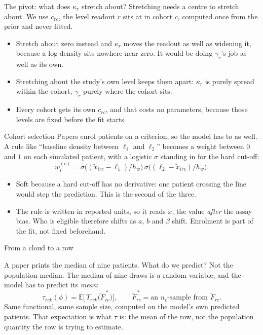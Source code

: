 \documentclass[10pt,aspectratio=169]{beamer}
\begin{document}
\begin{frame}[t]{The pivot: what does $\kappa_r$ stretch about?}
  Stretching needs a centre to stretch about. We use $c_{rc}$, the level readout
  $r$ sits at in cohort $c$, computed once from the prior and never fitted.
  \begin{itemize}\setlength\itemsep{8pt}
    \item Stretch about zero instead and $\kappa_r$ moves the readout as well as
      widening it, because a log density sits nowhere near zero. It would be
      doing $\gamma_r$'s job as well as its own.
    \item Stretching about the study's own level keeps them apart: $\kappa_r$ is
      purely spread within the cohort, $\gamma_r$ purely where the cohort sits.
    \item Every cohort gets its own $c_{rc}$, and that costs no parameters,
      because those levels are fixed before the fit starts.
  \end{itemize}
\end{frame}

\begin{frame}[t]{Cohort selection}
  Papers enrol patients on a criterion, so the model has to as well. A rule like
  ``baseline density between $\ell_1$ and $\ell_2$'' becomes a weight between $0$
  and $1$ on each simulated patient, with a logistic $\sigma$ standing in for the
  hard cut-off:
  \[
    w^{(c)}_i = \sigma\!\big((\tilde x_{irc}-\ell_1)/h_w\big)\,
                \sigma\!\big((\ell_2-\tilde x_{irc})/h_w\big).
  \]
  \begin{itemize}
    \item Soft because a hard cut-off has no derivative: one patient crossing the
      line would step the prediction. This is the second of the three.
    \item The rule is written in reported units, so it reads $\tilde x$, the
      value \emph{after} the assay bias. Who is eligible therefore shifts as $a$,
      $b$ and $\beta$ shift. Enrolment is part of the fit, not fixed beforehand.
  \end{itemize}
\end{frame}

\begin{frame}[standout]
  From a cloud to a row
\end{frame}

\begin{frame}[t]{A paper prints the median of nine patients. What do we predict?}
  \vfill
  Not the population median. The median of nine draws is a random variable, and
  the model has to predict its \emph{mean}:
  \[
    \tau_{rck}(\phi) = \mathbb{E}\Big[\,T_{rck}\big(\tilde F^{\,\ast}_{rc}\big)\Big],
    \qquad \tilde F^{\,\ast}_{rc} = \text{an } n_c\text{-sample from } \tilde F_{rc}.
  \]
  \vfill
  Same functional, same sample size, computed on the model's own predicted
  patients. That expectation is what $\tau$ is: the mean of the row, not the
  population quantity the row is trying to estimate.
\end{frame}
\end{document}
